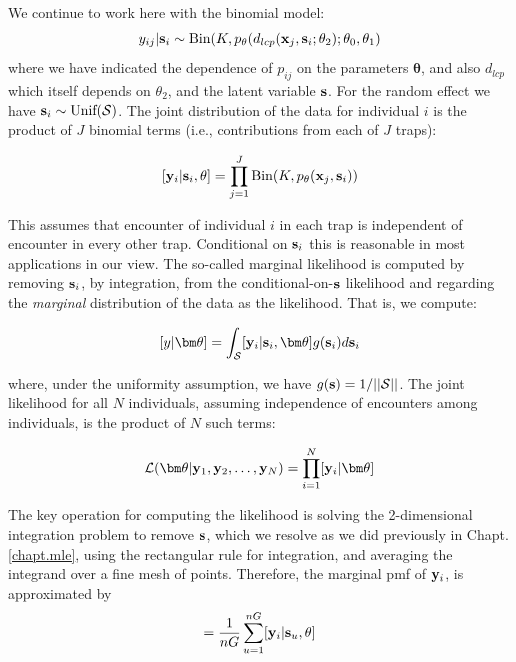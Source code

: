 We continue to work here with the binomial model:
\[
	y_{ij}| {\bf s}_{i} \sim \mbox{Bin}(K, p_{\theta}(d_{lcp}({\bf x}_{j},{\bf s}_{i};\theta_{2}); \theta_{0}, \theta_{1})
\]
where we have indicated the dependence of $p_{ij}$ on the parameters
${\bm \theta}$, and also $d_{lcp}$ which
itself depends on $\theta_{2}$, and the latent variable ${\bf s}$.
For the random effect we have ${\bf s}_{i} \sim  \mbox{Unif}({\cal
  S})$.
The joint distribution of the data for individual $i$ is the product
of $J$ binomial terms (i.e., contributions from each of $J$ traps):

\[
  [{\bf y}_{i} | {\bf s}_{i} , \theta] =
  \prod_{j=1}^{J} \mbox{Bin}(K, p_{\theta}({\bf x}_{j},{\bf s}_{i}) )
\]

{\flushleft This} assumes that encounter of individual $i$ in each
trap is independent of encounter in every other trap. Conditional on
${\bf s}_{i}$ this is reasonable in most applications in our view.
 The so-called marginal likelihood is computed by removing
${\bf s}_{i}$, by integration,  from the conditional-on-${\bf s}$
likelihood and regarding the {\it marginal} distribution of the data
as the likelihood. That
is, we compute:

\[
  [y|{\bm \theta}] =
\int_{{\cal S}}  [ {\bf y}_{i} |{\bf s}_{i},{\bm \theta}] g({\bf s}_{i}) d{\bf s}_{i}
\]

{\flushleft where}, under the uniformity assumption, we have
$g({\bf s}) = 1/||{\cal S}||$.
The joint likelihood for all $N$ individuals, assuming independence of
encounters among individuals, is the product of $N$ such terms:

\[
{\cal L}({\bm \theta} | {\bf y}_{1},{\bf y}_{2},\ldots, {\bf y}_{N}) = \prod_{i=1}^{N}
[{\bf y}_{i}|{\bm \theta}]
\]

The key operation for computing the likelihood is solving the
2-dimensional integration problem to remove ${\bf s}$, which we
resolve as we did previously in Chapt. \ref{chapt.mle}, using the
rectangular rule for integration, and averaging the integrand over a
fine mesh of points.
Therefore, 
the marginal pmf of ${\bf y}_{i}$, is
approximated by
\begin{equation}
         [{\bf y}_{i}|\theta] = \frac{1}{nG} \sum_{u=1}^{nG}  [ {\bf
            y}_{i} |{\bf s}_u, \theta]
\label{mle.eq.intlik}
\end{equation}

